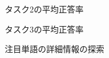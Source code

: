 \documentclass[syuuron]{kuee}
\begin{document}
		\begin{figure}
			\begin{center}
			\end{center}
			\caption{タスク2の平均正答率}
	  		\label{fig:res5}
		\end{figure}
		\begin{figure}
			\begin{center}
			\end{center}
			\caption{タスク3の平均正答率}
	  		\label{fig:res6}
		\end{figure}
		\begin{figure}
			\begin{center}
			\end{center}
			\caption{注目単語の詳細情報の探索}
	  		\label{fig:cas1}
		\end{figure}
\end{document}
